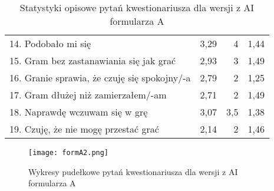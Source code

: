 \begin{table}[h!]
\begin{center}
\begin{tabular}{|m{10em}|r|r|r|}
            14. Podobało mi się                                               & 3,29          & 4       & 1,44           \\
            15. Gram bez zastanawiania się jak grać                           & 2,93          & 3       & 1,49           \\
            16. Granie sprawia, \newline że czuję się spokojny/-a             & 2,79          & 2       & 1,25           \\
            17. Gram dłużej \newline niż zamierzałem/-am                      & 2,71          & 2       & 1,49           \\
            18. Naprawdę wczuwam się w grę                                    & 3,07          & 3,5     & 1,38           \\
            19. Czuję, że nie mogę przestać grać                              & 2,14          & 2       & 1,46           \\
            \hline
        \end{tabular}
    \end{center}
    \caption{Statystyki opisowe pytań kwestionariusza dla wersji z AI formularza A}\label{tab1:appendixB_8}
\end{table}

\begin{figure}[h!]
    \centering
    \texttt{[image: formA2.png]}
    \caption{Wykresy pudełkowe pytań kwestionariusza dla wersji z AI formularza A}
    \label{fig:appendixB_formA2}
\end{figure}

